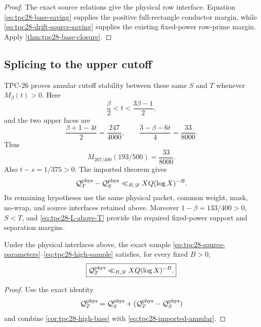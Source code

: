 \begin{proof}
The exact source relations give the physical row interface.
Equation \eqref{eq:tpc28-base-saving} supplies the positive
full-rectangle conductor margin, while
\eqref{eq:tpc28-drift-source-saving} supplies the existing fixed-power
row-prime margin.  Apply \cref{thm:tpc28-base-closure}.
\end{proof}

\subsection{Splicing to the upper cutoff}

TPC-26 proves annular cutoff stability between these same $S$ and
$T$ whenever $M_\beta(t)>0$.  Here
\begin{equation}
 \frac\beta2<t<\frac{3\beta-1}{2},
\end{equation}
and the two upper faces are
\begin{equation}
 \frac{\beta+1-4t}{2}=\frac{247}{4000},
 \qquad
 \frac{3-\beta-6t}{4}=\frac{33}{8000}.
 \label{eq:tpc28-upper-faces}
\end{equation}
Thus
\begin{equation}
 \boxed{M_{267/400}(193/500)=\frac{33}{8000}.}
 \label{eq:tpc28-upper-saving}
\end{equation}
Also $t-s=1/375>0$.  The imported theorem gives
\begin{equation}
 \mathcal Q_T^{\rm phys}-\mathcal Q_S^{\rm phys}
 \ll_{B,\mathscr D}XQ(\log X)^{-B}.
 \label{eq:tpc28-imported-annular}
\end{equation}
Its remaining hypotheses use the same physical packet, common weight,
mask, no-wrap, and source interfaces retained above.  Moreover
$1-\beta=133/400>0$, $S<T$, and \eqref{eq:tpc28-L-above-T} provide
the required fixed-power support and separation margins.

\begin{theorem}
\label{thm:tpc28-high-upper}
Under the physical interfaces above, the exact sample
\eqref{eq:tpc28-source-parameters}--\eqref{eq:tpc28-high-sample}
satisfies, for every fixed $B>0$,
\begin{equation}
 \boxed{
 \mathcal Q_T^{\rm phys}
 \ll_{B,\mathscr D}XQ(\log X)^{-B}.}
 \label{eq:tpc28-high-upper-closure}
\end{equation}
\end{theorem}

\begin{proof}
Use the exact identity
\[
 \mathcal Q_T^{\rm phys}
 =\mathcal Q_S^{\rm phys}
 +(\mathcal Q_T^{\rm phys}-\mathcal Q_S^{\rm phys})
\]
and combine \cref{cor:tpc28-high-base} with
\eqref{eq:tpc28-imported-annular}.
\end{proof}

